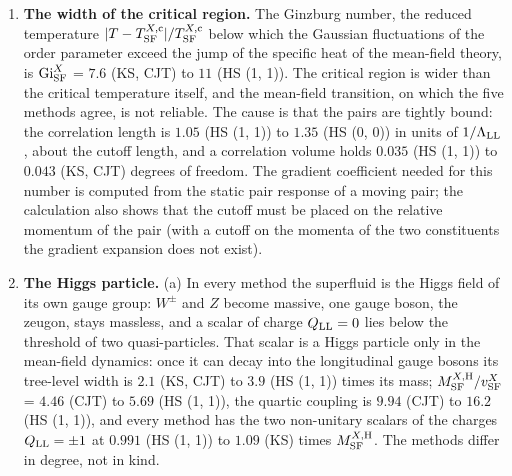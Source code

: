 \documentclass[
  10pt,
]{article}
\providecommand{\tightlist}{%
  \setlength{\itemsep}{0pt}\setlength{\parskip}{0pt}}
\begin{document}
\begin{enumerate}
\def\labelenumi{\arabic{enumi}.}
\tightlist
\item
  \textbf{The width of the critical region.} The Ginzburg number, the
  reduced temperature
  \(\lvert T-T^{X,{\rm c}}_{\rm SF}\rvert/T^{X,{\rm c}}_{\rm SF}\) below
  which the Gaussian fluctuations of the order parameter exceed the jump
  of the specific heat of the mean-field theory, is
  \({\rm Gi}^{X}_{\rm SF}\) = \(7.6\) (KS, CJT) to \(11\) (HS (1, 1)).
  The critical region is wider than the critical temperature itself, and
  the mean-field transition, on which the five methods agree, is not
  reliable. The cause is that the pairs are tightly bound: the
  correlation length is \(1.05\) (HS (1, 1)) to \(1.35\) (HS (0, 0)) in
  units of \(1/\Lambda_{\rm LL}\), about the cutoff length, and a
  correlation volume holds \(0.035\) (HS (1, 1)) to \(0.043\) (KS, CJT)
  degrees of freedom. The gradient coefficient needed for this number is
  computed from the static pair response of a moving pair; the
  calculation also shows that the cutoff must be placed on the relative
  momentum of the pair (with a cutoff on the momenta of the two
  constituents the gradient expansion does not exist).
\item
  \textbf{The Higgs particle.} (a) In every method the superfluid is the
  Higgs field of its own gauge group: \(W^\pm\) and \(Z\) become
  massive, one gauge boson, the zeugon, stays massless, and a scalar of
  charge \(Q_{\rm LL}=0\) lies below the threshold of two
  quasi-particles. That scalar is a Higgs particle only in the
  mean-field dynamics: once it can decay into the longitudinal gauge
  bosons its tree-level width is \(2.1\) (KS, CJT) to \(3.9\) (HS (1,
  1)) times its mass; \(M^{X,{\rm H}}_{\rm SF}/v^X_{\rm SF}\) = \(4.46\)
  (CJT) to \(5.69\) (HS (1, 1)), the quartic coupling is \(9.94\) (CJT)
  to \(16.2\) (HS (1, 1)), and every method has the two non-unitary
  scalars of the charges \(Q_{\rm LL}=\pm1\) at \(0.991\) (HS (1, 1)) to
  \(1.09\) (KS) times \(M^{X,{\rm H}}_{\rm SF}\). The methods differ in
  degree, not in kind.


\end{enumerate}
\end{document}
